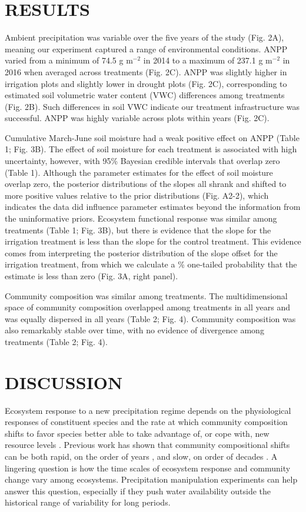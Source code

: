 \documentclass[fleqn,10pt,lineno]{wlpeerj} %
\begin{document}
\section{RESULTS}\label{results}

Ambient precipitation was variable over the five years of the study
(Fig. 2A), meaning our experiment captured a range of environmental
conditions. ANPP varied from a minimum of 74.5 g m\(^{-2}\) in 2014 to a
maximum of 237.1 g m\(^{-2}\) in 2016 when averaged across treatments
(Fig. 2C). ANPP was slightly higher in irrigation plots and slightly
lower in drought plots (Fig. 2C), corresponding to estimated soil
volumetric water content (VWC) differences among treatments (Fig. 2B).
Such differences in soil VWC indicate our treatment infrastructure was
successful. ANPP was highly variable across plots within years (Fig.
2C).

Cumulative March-June soil moisture had a weak positive effect on ANPP
(Table 1; Fig. 3B). The effect of soil moisture for each treatment is
associated with high uncertainty, however, with 95\% Bayesian credible
intervals that overlap zero (Table 1). Although the parameter estimates
for the effect of soil moisture overlap zero, the posterior
distributions of the slopes all shrank and shifted to more positive
values relative to the prior distributions (Fig. A2-2), which indicates
the data did influence parameter estimates beyond the information from
the uninformative priors. Ecosystem functional response was similar
among treatments (Table 1; Fig. 3B), but there is evidence that the
slope for the irrigation treatment is less than the slope for the
control treatment. This evidence comes from interpreting the posterior
distribution of the slope offset for the irrigation treatment, from
which we calculate a \% one-tailed probability that the estimate
is less than zero (Fig. 3A, right panel).

Community composition was similar among treatments. The multidimensional
space of community composition overlapped among treatments in all years
and was equally dispersed in all years (Table 2; Fig. 4). Community
composition was also remarkably stable over time, with no evidence of
divergence among treatments (Table 2; Fig. 4).

\section{DISCUSSION}\label{discussion}

Ecosystem response to a new precipitation regime depends on the
physiological responses of constituent species and the rate at which
community composition shifts to favor species better able to take
advantage of, or cope with, new resource levels \citep{Smith2009}.
Previous work has shown that community compositional shifts can be both
rapid, on the order of years \citep{Hoover2014}, and slow, on order of
decades \citep{Knapp2012, Wilcox2016}. A lingering question is how the
time scales of ecosystem response and community change vary among
ecosystems. Precipitation manipulation experiments can help answer this
question, especially if they push water availability outside the
historical range of variability for long periods.
\end{document}
